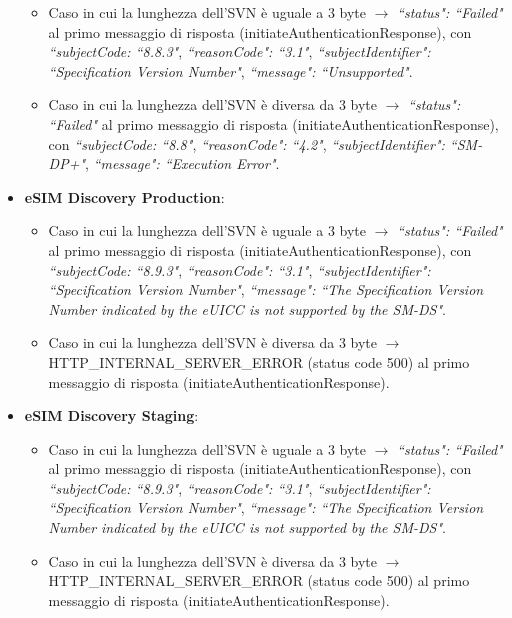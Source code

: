 \documentclass[10pt, oneside]{book}
\begin{document}
\begin{itemize}
\begin{itemize}
\item Caso in cui la lunghezza dell'SVN è uguale a 3 byte $\rightarrow$ \textit{``status": ``Failed"} al primo messaggio di risposta (initiateAuthenticationResponse), con \textit{``subjectCode: ``8.8.3"}, \textit{``reasonCode": ``3.1"}, \textit{``subjectIdentifier": ``Specification Version Number"}, \textit{``message": ``Unsupported"}.
\item Caso in cui la lunghezza dell'SVN è diversa da 3 byte $\rightarrow$ \textit{``status": ``Failed"} al primo messaggio di risposta (initiateAuthenticationResponse), con \textit{``subjectCode: ``8.8"}, \textit{``reasonCode": ``4.2"}, \textit{``subjectIdentifier": ``SM-DP+"}, \textit{``message": ``Execution Error"}.
\end{itemize}
\item \textbf{eSIM Discovery Production}:
\begin{itemize}
\item Caso in cui la lunghezza dell'SVN è uguale a 3 byte $\rightarrow$ \textit{``status": ``Failed"} al primo messaggio di risposta (initiateAuthenticationResponse), con \textit{``subjectCode: ``8.9.3"}, \textit{``reasonCode": ``3.1"}, \textit{``subjectIdentifier": ``Specification Version Number"}, \textit{``message": ``The Specification Version Number indicated  by the eUICC is not supported by the SM-DS"}.
\item Caso in cui la lunghezza dell'SVN è diversa da 3 byte $\rightarrow$\\HTTP\_INTERNAL\_SERVER\_ERROR (status code 500) al primo messaggio di risposta (initiateAuthenticationResponse).\\
\end{itemize}
\item \textbf{eSIM Discovery Staging}:
\begin{itemize}
\item Caso in cui la lunghezza dell'SVN è uguale a 3 byte $\rightarrow$ \textit{``status": ``Failed"} al primo messaggio di risposta (initiateAuthenticationResponse), con \textit{``subjectCode: ``8.9.3"}, \textit{``reasonCode": ``3.1"}, \textit{``subjectIdentifier": ``Specification Version Number"}, \textit{``message": ``The Specification Version Number indicated  by the eUICC is not supported by the SM-DS"}.
\item Caso in cui la lunghezza dell'SVN è diversa da 3 byte $\rightarrow$\\HTTP\_INTERNAL\_SERVER\_ERROR (status code 500) al primo messaggio di risposta (initiateAuthenticationResponse).

\end{itemize}
\end{itemize}
\end{document}
